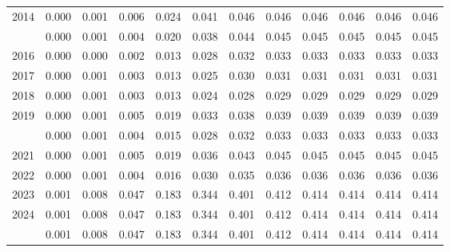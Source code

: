 \documentclass[
]{article}
\begin{document}
\begin{longtable}[t]{lrrrrrrrrrrr}
2014 & 0.000 & 0.001 & 0.006 & 0.024 & 0.041 & 0.046 & 0.046 & 0.046 & 0.046 & 0.046 & 0.046\\
\addlinespace
2015 & 0.000 & 0.001 & 0.004 & 0.020 & 0.038 & 0.044 & 0.045 & 0.045 & 0.045 & 0.045 & 0.045\\
2016 & 0.000 & 0.000 & 0.002 & 0.013 & 0.028 & 0.032 & 0.033 & 0.033 & 0.033 & 0.033 & 0.033\\
2017 & 0.000 & 0.001 & 0.003 & 0.013 & 0.025 & 0.030 & 0.031 & 0.031 & 0.031 & 0.031 & 0.031\\
2018 & 0.000 & 0.001 & 0.003 & 0.013 & 0.024 & 0.028 & 0.029 & 0.029 & 0.029 & 0.029 & 0.029\\
2019 & 0.000 & 0.001 & 0.005 & 0.019 & 0.033 & 0.038 & 0.039 & 0.039 & 0.039 & 0.039 & 0.039\\
\addlinespace
2020 & 0.000 & 0.001 & 0.004 & 0.015 & 0.028 & 0.032 & 0.033 & 0.033 & 0.033 & 0.033 & 0.033\\
2021 & 0.000 & 0.001 & 0.005 & 0.019 & 0.036 & 0.043 & 0.045 & 0.045 & 0.045 & 0.045 & 0.045\\
2022 & 0.000 & 0.001 & 0.004 & 0.016 & 0.030 & 0.035 & 0.036 & 0.036 & 0.036 & 0.036 & 0.036\\
2023 & 0.001 & 0.008 & 0.047 & 0.183 & 0.344 & 0.401 & 0.412 & 0.414 & 0.414 & 0.414 & 0.414\\
2024 & 0.001 & 0.008 & 0.047 & 0.183 & 0.344 & 0.401 & 0.412 & 0.414 & 0.414 & 0.414 & 0.414\\
\addlinespace
2025 & 0.001 & 0.008 & 0.047 & 0.183 & 0.344 & 0.401 & 0.412 & 0.414 & 0.414 & 0.414 & 0.414\\*
\end{longtable}
\end{document}
